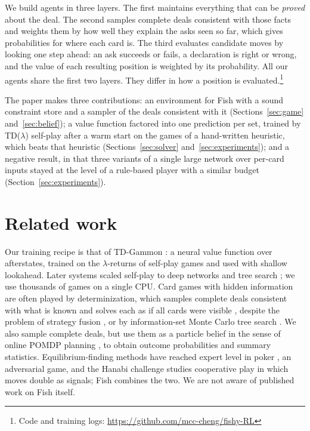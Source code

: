 \documentclass{article}
\begin{document}
We build agents in three layers.  The first maintains everything that can be
\emph{proved} about the deal.  The second samples complete deals consistent
with those facts and weights them by how well they explain the asks seen so
far, which gives probabilities for where each card is.  The third evaluates
candidate moves by looking one step ahead: an ask succeeds or fails, a
declaration is right or wrong, and the value of each resulting position is
weighted by its probability.  All our agents share the first two layers.  They
differ in how a position is evaluated.\footnote{Code and training logs:
\url{https://github.com/mcc-cheng/fishy-RL}}

The paper makes three contributions: an environment for Fish with a sound
constraint store and a sampler of the deals consistent with it
(Sections~\ref{sec:game} and~\ref{sec:belief}); a value function factored into
one prediction per set, trained by TD($\lambda$) self-play after a warm start
on the games of a hand-written heuristic, which beats that heuristic
(Sections~\ref{sec:solver} and~\ref{sec:experiments}); and a negative result,
in that three variants of a single large network over per-card inputs stayed at
the level of a rule-based player with a similar budget
(Section~\ref{sec:experiments}).

\section{Related work}

Our training recipe is that of TD-Gammon \citep{tesauro1995}: a neural value
function over afterstates, trained on the $\lambda$-returns
\citep{sutton1988,suttonbarto2018} of self-play games and used with shallow
lookahead.  Later systems scaled self-play to deep networks and tree search
\citep{silver2018}; we use thousands of games on a single CPU.  Card games with
hidden information are often played by
determinization, which samples complete deals consistent with what is known and
solves each as if all cards were visible \citep{ginsberg2001,long2010}, despite
the problem of strategy fusion \citep{frank1998}, or by information-set Monte
Carlo tree search \citep{cowling2012}.  We also sample complete deals, but use
them as a particle belief in the sense of online POMDP planning
\citep{kaelbling1998,silver2010,kochenderfer2022}, to obtain outcome
probabilities and summary statistics.  Equilibrium-finding methods have reached
expert level in poker \citep{zinkevich2007,moravcik2017,brown2019}, an
adversarial game, and the Hanabi challenge \citep{bard2020} studies
cooperative play in which moves double as signals; Fish combines the two.  We
are not aware of published work on Fish itself.
\end{document}
